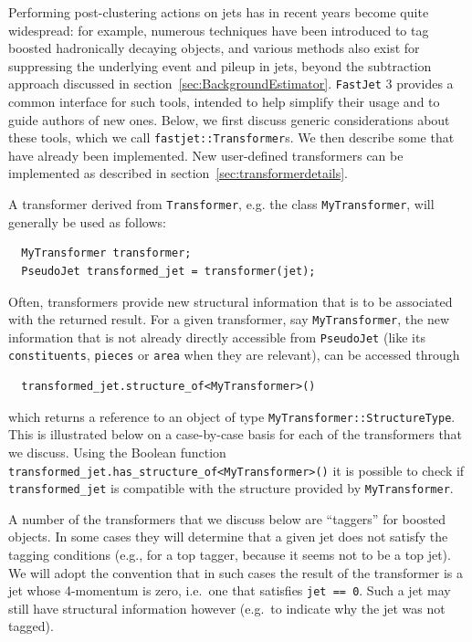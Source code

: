 \documentclass[12pt,a4]{article}
\newcommand{\fastjet}{\texttt{FastJet}\xspace}
\newcommand{\ttt}[1]{{\small\texttt{#1}}}
\begin{document}
Performing post-clustering actions on jets has in recent years become
quite widespread: for example, numerous techniques have been
introduced to tag boosted hadronically decaying objects, and various
methods also exist for suppressing the underlying event and pileup in
jets, beyond the subtraction approach discussed in
section~\ref{sec:BackgroundEstimator}.
%
\fastjet 3 provides a common interface for such
tools, intended to help simplify their usage and to guide authors of
new ones.
%
Below, we first discuss generic considerations about these tools, which
we call \ttt{fastjet::Transformer}s. 
%
We then describe some that have already been implemented. 
%
New user-defined transformers can be implemented as described in 
section~\ref{sec:transformerdetails}.



A transformer derived from \ttt{Transformer}, e.g. the
 class \ttt{MyTransformer}, will generally be used as follows:
\begin{lstlisting}
  MyTransformer transformer;
  PseudoJet transformed_jet = transformer(jet);
\end{lstlisting}
Often, transformers provide new structural information that is to be
associated with the returned result. 
%
For a given transformer, say \ttt{MyTransformer}, the new information
that is not already directly accessible from \ttt{PseudoJet} (like its
\ttt{constituents}, \ttt{pieces} or \ttt{area} when they are
relevant), can be accessed through
\begin{lstlisting}
  transformed_jet.structure_of<MyTransformer>()
\end{lstlisting}
which returns a reference to an object of type
\ttt{MyTransformer::StructureType}.
%
This is illustrated below on a case-by-case basis for each of the
transformers that we discuss.
%
Using the Boolean function
\ttt{transformed\_jet.has\_structure\_of<MyTransformer>()} it is possible to
check if \ttt{transformed\_jet} is compatible with the structure provided by
\ttt{MyTransformer}.

A number of the transformers that we discuss below are ``taggers'' for
boosted objects.
%
In some cases they will determine that a given jet does not satisfy
the tagging conditions (e.g., for a top tagger, because it seems not
to be a top jet).
%
We will adopt the convention that in such cases the result of the
transformer is a jet whose 4-momentum is zero, i.e.\ one that satisfies
\ttt{jet == 0}.
%
Such a jet may still have structural information however (e.g.\ to
indicate why the jet was not tagged).
\end{document}
